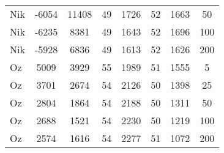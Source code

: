 \begin{table}[ht]
\begin{tabular}{lccccccc}
  Nik & -6054 & 11408 & 49 & 1726 & 52 & 1663 & 50 \\ 
  Nik & -6235 & 8381 & 49 & 1643 & 52 & 1696 & 100 \\ 
  Nik & -5928 & 6836 & 49 & 1613 & 52 & 1626 & 200 \\ 
  Oz & 5009 & 3929 & 55 & 1989 & 51 & 1555 & 5 \\ 
  Oz & 3701 & 2674 & 54 & 2126 & 50 & 1398 & 25 \\ 
  Oz & 2804 & 1864 & 54 & 2188 & 50 & 1311 & 50 \\ 
  Oz & 2688 & 1521 & 54 & 2230 & 50 & 1219 & 100 \\ 
  Oz & 2574 & 1616 & 54 & 2277 & 51 & 1072 & 200 \\ 
   \bottomrule \end{tabular}
\end{table}
